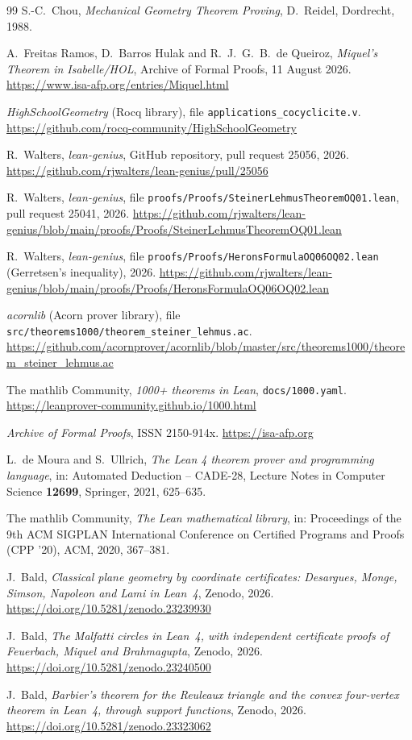 \documentclass[11pt]{article}
\theoremstyle{definition}
\theoremstyle{remark}
\begin{document}
\begin{thebibliography}{99}
S.-C.~Chou,
\emph{Mechanical Geometry Theorem Proving},
D.~Reidel, Dordrecht, 1988.

A.~Freitas Ramos, D.~Barros Hulak and R.~J.~G.~B.~de Queiroz,
\emph{Miquel's Theorem in Isabelle/HOL}, Archive of Formal Proofs, 11 August 2026.
\url{https://www.isa-afp.org/entries/Miquel.html}

\emph{HighSchoolGeometry} (Rocq library), file \texttt{applications\_cocyclicite.v}.
\url{https://github.com/rocq-community/HighSchoolGeometry}

R.~Walters,
\emph{lean-genius}, GitHub repository, pull request 25056, 2026.
\url{https://github.com/rjwalters/lean-genius/pull/25056}

R.~Walters,
\emph{lean-genius}, file \texttt{proofs/Proofs/SteinerLehmusTheoremOQ01.lean}, pull request 25041, 2026.
\url{https://github.com/rjwalters/lean-genius/blob/main/proofs/Proofs/SteinerLehmusTheoremOQ01.lean}

R.~Walters,
\emph{lean-genius}, file \texttt{proofs/Proofs/HeronsFormulaOQ06OQ02.lean} (Gerretsen's inequality), 2026.
\url{https://github.com/rjwalters/lean-genius/blob/main/proofs/Proofs/HeronsFormulaOQ06OQ02.lean}

\emph{acornlib} (Acorn prover library), file \texttt{src/theorems1000/theorem\_steiner\_lehmus.ac}.
\url{https://github.com/acornprover/acornlib/blob/master/src/theorems1000/theorem_steiner_lehmus.ac}

The mathlib Community, \emph{1000+ theorems in Lean}, \texttt{docs/1000.yaml}.
\url{https://leanprover-community.github.io/1000.html}

\emph{Archive of Formal Proofs}, ISSN 2150-914x. \url{https://isa-afp.org}

L.~de Moura and S.~Ullrich,
\emph{The Lean 4 theorem prover and programming language},
in: Automated Deduction -- CADE-28, Lecture Notes in Computer Science \textbf{12699}, Springer, 2021, 625--635.

The mathlib Community,
\emph{The Lean mathematical library},
in: Proceedings of the 9th ACM SIGPLAN International Conference on Certified Programs and Proofs (CPP '20), ACM, 2020, 367--381.

J.~Bald,
\emph{Classical plane geometry by coordinate certificates: Desargues, Monge, Simson, Napoleon and Lami in Lean~4},
Zenodo, 2026. \url{https://doi.org/10.5281/zenodo.23239930}

J.~Bald,
\emph{The Malfatti circles in Lean~4, with independent certificate proofs of Feuerbach, Miquel and Brahmagupta},
Zenodo, 2026. \url{https://doi.org/10.5281/zenodo.23240500}

J.~Bald,
\emph{Barbier's theorem for the Reuleaux triangle and the convex four-vertex theorem in Lean~4, through support functions},
Zenodo, 2026. \url{https://doi.org/10.5281/zenodo.23323062}

\end{thebibliography}
\end{document}
